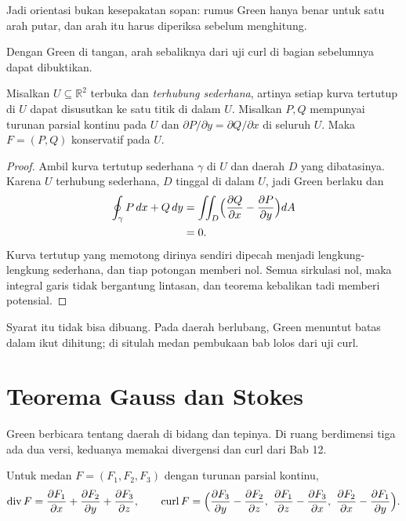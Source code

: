 Jadi orientasi bukan kesepakatan sopan: rumus Green hanya benar untuk satu
arah putar, dan arah itu harus diperiksa sebelum menghitung.

Dengan Green di tangan, arah sebaliknya dari uji curl di bagian sebelumnya
dapat dibuktikan.

\begin{akibat}
Misalkan $U\subseteq\mathbb{R}^{2}$ terbuka dan \emph{terhubung sederhana},
artinya setiap kurva tertutup di $U$ dapat disusutkan ke satu titik di dalam
$U$. Misalkan $P,Q$ mempunyai turunan parsial kontinu pada $U$ dan $\partial
P/\partial y=\partial Q/\partial x$ di seluruh $U$. Maka $F=(P,Q)$ konservatif
pada $U$.
\end{akibat}

\begin{proof}
Ambil kurva tertutup sederhana $\gamma$ di $U$ dan daerah $D$ yang
dibatasinya. Karena $U$ terhubung sederhana, $D$ tinggal di dalam $U$, jadi
Green berlaku dan
\begin{align*}
\oint_{\gamma}P\,dx+Q\,dy
&=\iint_{D}\Bigl(\frac{\partial Q}{\partial x}-\frac{\partial P}{\partial y}\Bigr)dA\\
&=0 .
\end{align*}
Kurva tertutup yang memotong dirinya sendiri dipecah menjadi lengkung-lengkung
sederhana, dan tiap potongan memberi nol. Semua sirkulasi nol, maka integral
garis tidak bergantung lintasan, dan teorema kebalikan tadi memberi potensial.
\end{proof}

Syarat itu tidak bisa dibuang. Pada daerah berlubang, Green menuntut batas
dalam ikut dihitung; di situlah medan pembukaan bab lolos dari uji curl.

\section{Teorema Gauss dan Stokes}

Green berbicara tentang daerah di bidang dan tepinya. Di ruang berdimensi tiga
ada dua versi, keduanya memakai divergensi dan curl dari Bab 12.

\begin{definisi}
 Untuk medan $F=(F_{1},F_{2},F_{3})$ dengan
turunan parsial kontinu,
\[
\operatorname{div}F=\frac{\partial F_{1}}{\partial x}
+\frac{\partial F_{2}}{\partial y}+\frac{\partial F_{3}}{\partial z},
\qquad
\operatorname{curl}F=\Bigl(\frac{\partial F_{3}}{\partial y}
-\frac{\partial F_{2}}{\partial z},\
\frac{\partial F_{1}}{\partial z}-\frac{\partial F_{3}}{\partial x},\
\frac{\partial F_{2}}{\partial x}-\frac{\partial F_{1}}{\partial y}\Bigr).
\]
\end{definisi}

